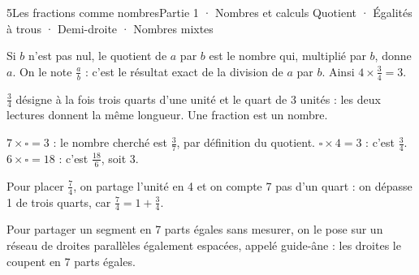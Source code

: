 \begin{ouverture}[calcul]{5}{Les fractions comme nombres}{Partie 1 · Nombres et calculs}
{Quotient · Égalités à trous · Demi-droite · Nombres mixtes}
\end{ouverture}
\pagestyle{otMain}\essentiel\fontsize{11}{15}\selectfont
{}\label{cours-5-1}
\begin{definition}Si $b$ n’est pas nul, le quotient de $a$ par $b$ est le nombre qui, multiplié par $b$, donne $a$. On le note $\frac ab$ : c’est le résultat exact de la division de $a$ par $b$. Ainsi $4\times\frac34=3$.\end{definition}
\label{fig-cours-5-1-cours-quart-de-3}

\begin{propriete}$\frac34$ désigne à la fois trois quarts d’une unité et le quart de 3 unités : les deux lectures donnent la même longueur. Une fraction est un nombre.\end{propriete}
\begin{savoirfaire}$7\times\square=3$ : le nombre cherché est $\frac37$, par définition du quotient. $\square\times4=3$ : c’est $\frac34$. $6\times\square=18$ : c’est $\frac{18}6$, soit 3.\end{savoirfaire}
\clearpage
{}\label{cours-5-2}
\begin{savoirfaire}Pour placer $\frac74$, on partage l’unité en 4 et on compte 7 pas d’un quart : on dépasse 1 de trois quarts, car $\frac74=1+\frac34$.\end{savoirfaire}
\label{fig-cours-5-2-cours-droite-quarts}

\begin{savoirfaire}Pour partager un segment en 7 parts égales sans mesurer, on le pose sur un réseau de droites parallèles également espacées, appelé guide-âne : les droites le coupent en 7 parts égales.\end{savoirfaire}
\label{fig-cours-5-2-cours-guide-ane}

